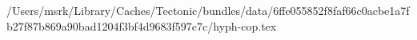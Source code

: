/Users/msrk/Library/Caches/Tectonic/bundles/data/6ffe055852f8faf66c0acbe1a7fb27f87b869a90bad1204f3bf4d9683f597c7c/hyph-cop.tex